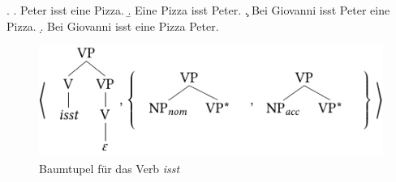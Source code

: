 \ex. \label{ex-scrambling}
\a. Peter isst eine Pizza. \label{ex-scrambling-a}
\b. Eine Pizza isst Peter. \label{ex-scrambling-b}
\c. Bei Giovanni isst Peter eine Pizza. \label{ex-scrambling-c}
\d. Bei Giovanni isst eine Pizza Peter. \label{ex-scrambling-d}

\begin{figure}[t]
\centering
\includegraphics{graphics/abb71.pdf}
\caption{\label{fig-ttmctag-tupel}Baumtupel für das Verb {\it isst}}
\end{figure}

